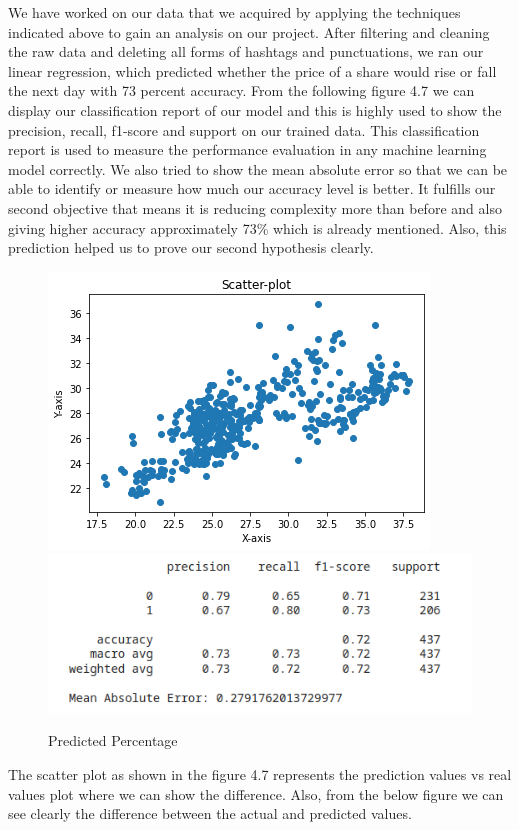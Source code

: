 We have worked on our data that we acquired by applying the techniques indicated above to gain an analysis on our project. After filtering and cleaning the raw data and deleting all forms of hashtags and punctuations, we ran our linear regression, which predicted whether the price of a share would rise or fall the next day with 73 percent accuracy. From the following figure 4.7 we can display our classification report of our model and this is highly used to show the precision, recall, f1-score and support on our trained data. This classification report is used to measure the performance evaluation in any machine learning model correctly. We also tried to show the mean absolute error so that we can be able to identify or measure how much our accuracy level is better. It fulfills our second objective that means it is reducing complexity more than before and also giving higher accuracy approximately 73\% which is already mentioned. Also, this prediction helped us to prove our second hypothesis clearly.
\begin{figure}[H]
    \centering
    \includegraphics[scale=.6]{img4/score2.png}
    \includegraphics[scale=1]{img4/score1.png}
    \caption{Predicted Percentage}
    \label{fig:Predict}
\end{figure}
The scatter plot as shown in the figure 4.7 represents the prediction values vs real values plot where we can show the difference. Also, from the below figure we can see clearly the difference between the actual and predicted values.\\
